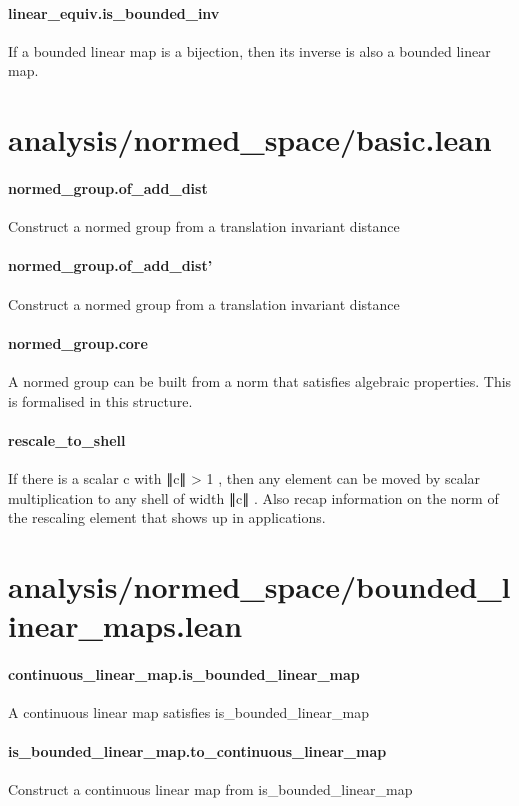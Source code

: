 \documentclass{article}
\begin{document}
\paragraph{linear\_equiv.is\_bounded\_inv}
\par
If a bounded linear map is a bijection, then its inverse is also a bounded linear map.
\section{analysis/normed\_space/basic.lean}\paragraph{normed\_group.of\_add\_dist}
\par
Construct a normed group from a translation invariant distance
\paragraph{normed\_group.of\_add\_dist'}
\par
Construct a normed group from a translation invariant distance
\paragraph{normed\_group.core}
\par
A normed group can be built from a norm that satisfies algebraic properties. This is
formalised in this structure.
\paragraph{rescale\_to\_shell}
\par
If there is a scalar 
\colorbox[RGB]{253,246,227}{{{{\color[RGB]{101, 123, 131} c }}}} with 
\colorbox[RGB]{253,246,227}{{{{\color[RGB]{101, 123, 131} ∥c∥ }}}{{{\color[RGB]{181, 137, 0} > }}}{{{\color[RGB]{108, 113, 196} 1 }}}}, then any element can be moved by scalar multiplication to
any shell of width 
\colorbox[RGB]{253,246,227}{{{{\color[RGB]{101, 123, 131} ∥c∥ }}}}. Also recap information on the norm of the rescaling element that shows
up in applications.
\section{analysis/normed\_space/bounded\_linear\_maps.lean}\paragraph{continuous\_linear\_map.is\_bounded\_linear\_map}
\par
A continuous linear map satisfies 
\colorbox[RGB]{253,246,227}{{{{\color[RGB]{101, 123, 131} is\_bounded\_linear\_map }}}}\paragraph{is\_bounded\_linear\_map.to\_continuous\_linear\_map}
\par
Construct a continuous linear map from is\_bounded\_linear\_map
\end{document}
